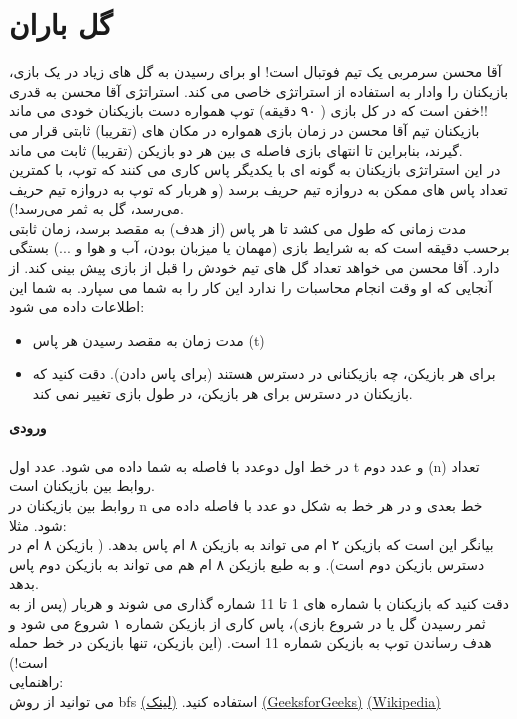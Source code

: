 \documentclass[]{article}
\begin{document}
\newpage


\section{گل باران}

آقا محسن سرمربی یک تیم فوتبال است! او برای رسیدن به گل های زیاد در یک بازی، بازیکنان را وادار به استفاده از استراتژی خاصی می کند. استراتژی آقا محسن به قدری خفن است که در کل بازی ( ۹۰ دقیقه) توپ همواره دست بازیکنان خودی می ماند!!\\
بازیکنان تیم آقا محسن در زمان بازی همواره در مکان های (تقریبا) ثابتی قرار می گیرند، بنابراین تا انتهای بازی فاصله ی بین هر دو بازیکن (تقریبا) ثابت می ماند.\\ 
در این استراتژی بازیکنان به گونه ای با یکدیگر پاس کاری می کنند که توپ، با کمترین تعداد پاس های ممکن به دروازه تیم حریف برسد (و هربار که توپ به دروازه تیم حریف می‌رسد، گل به ثمر می‌رسد!).\\
مدت زمانی که طول می کشد تا هر پاس (از هدف) به مقصد برسد، زمان ثابتی برحسب دقیقه است که به شرایط بازی (مهمان یا میزبان بودن، آب و هوا و ...) بستگی دارد.
آقا محسن می خواهد تعداد گل های تیم خودش را قبل از بازی پیش بینی کند. از آنجایی که او وقت انجام محاسبات را ندارد این کار را به شما می سپارد. 
به شما این اطلاعات داده می شود:
\begin{itemize}[label=$\ast$]
\item 	مدت زمان به مقصد رسیدن هر پاس (t)
\item	برای هر بازیکن، چه بازیکنانی در دسترس هستند (برای پاس دادن). دقت کنید که بازیکنان در دسترس برای هر بازیکن، در طول بازی تغییر نمی کند.\\
\end{itemize}


\textbf{ورودی}\\\\
در خط اول دوعدد با فاصله به شما داده می شود. عدد اول t و عدد دوم (n) تعداد روابط بین بازیکنان است.\\
روابط بین بازیکنان در n خط بعدی و در هر خط به شکل دو عدد با فاصله داده می شود. مثلا:
\\
بیانگر این است که بازیکن ۲ ام می تواند به بازیکن ۸ ام پاس بدهد. ( بازیکن ۸ ام در دسترس بازیکن دوم است). و به طبع بازیکن ۸ ام هم می تواند به بازیکن دوم پاس بدهد.\\
دقت کنید که بازیکنان با شماره های 1 تا 11 شماره گذاری می شوند و هربار (پس از به ثمر رسیدن گل یا در شروع بازی)، پاس کاری از بازیکن شماره ۱ شروع می شود و هدف رساندن توپ به بازیکن شماره 11 است. (این بازیکن، تنها بازیکن در خط حمله است!)\\
راهنمایی:\\ 
می توانید از روش  bfs استفاده کنید.  \href{http://www.algorithmha.ir/الگوریتم/جستجوی-اول-
سطح-bfs/}{(لینک)}
\href{https://www.geeksforgeeks.org/breadth-first-search-or-bfs-for-a-graph/}{(GeeksforGeeks)}
\href{https://en.wikipedia.org/wiki/Breadth-first_search}{(Wikipedia)}
\\
\end{document}
